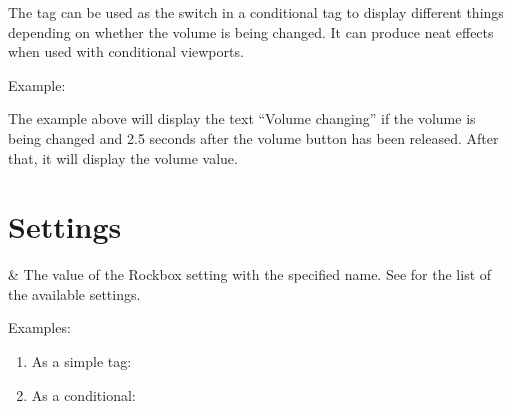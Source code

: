 The tag can be used as the switch in a conditional tag to display different things
depending on whether the volume is being changed. It can produce neat effects
when used with conditional viewports.

Example: 

The example above will display the text ``Volume changing'' if the volume is
being changed and 2.5 seconds after the volume button has been released. After
that, it will display the volume value.

\section{Settings}
  \begin{tagmap}
     & The value of the Rockbox
             setting with the specified name. See 
             for the list of the available settings.\\
  \end{tagmap}

Examples:
\begin{enumerate}
\item As a simple tag: 
\item As a conditional: 
\end{enumerate}


